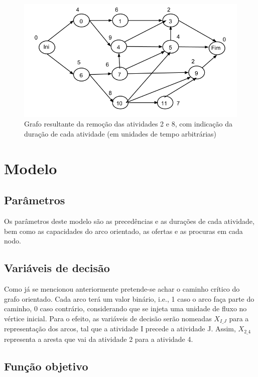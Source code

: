 \begin{figure}[<+htpb+>]
	\centering
	\includegraphics[scale=0.5]{./img/p1_rede_com_duracoes}
	\caption{Grafo resultante da remoção das atividades 2 e 8, com indicação da
	duração de cada atividade (em unidades de tempo arbitrárias)}
\label{p1:fig:rede_com_duracoes}
\end{figure}

\newpage
\section{Modelo}

\subsection{Parâmetros}

Os parâmetros deste modelo são as precedências e as durações de cada atividade,
bem como as capacidades do arco orientado, as ofertas e as procuras em cada
nodo.

\subsection{Variáveis de decisão}
\label{p1:subsec:vardec}


Como já se mencionou anteriormente pretende-se achar o caminho crítico do grafo
orientado. Cada arco terá um valor binário, i.e., 1 caso o arco faça parte do
caminho, 0 caso contrário, considerando que se injeta uma unidade de fluxo no
vértice inicial. Para o efeito, as variáveis de decisão serão nomeadas
$X_{I\_J}$ para a representação dos arcos, tal que a atividade I precede
a atividade J. Assim, $X_{2\_4}$ representa a aresta que vai da atividade 2 para
a atividade 4.

\subsection{Função objetivo}

